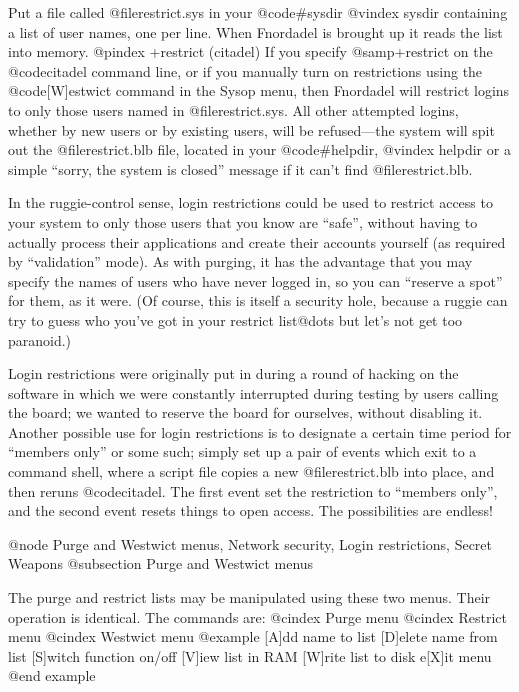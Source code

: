 Put a file called @file{restrict.sys} in your @code{#sysdir}
@vindex sysdir
containing a list of user names, one per line.  When
Fnordadel is brought up it reads the list into memory.
@pindex +restrict (citadel)
If you specify @samp{+restrict} on the @code{citadel} command
line, or if you manually turn on restrictions using the
@code{[W]estwict} command in the Sysop menu, then Fnordadel will
restrict logins to only those users named in @file{restrict.sys}.
All other attempted logins, whether by new users or by
existing users, will be refused---the system will spit
out the @file{restrict.blb} file, located in your @code{#helpdir},
@vindex helpdir
or a simple ``sorry, the system is closed'' message if it
can't find @file{restrict.blb}.

In the ruggie-control sense, login restrictions
could be used to restrict access to your system to only
those users that you know are ``safe'', without having to
actually process their applications and create their
accounts yourself (as required by ``validation'' mode).  As with purging,
it has the advantage that you may specify the names of
users who have never logged in, so you can ``reserve a
spot'' for them, as it were.  (Of course, this is itself a security
hole, because a ruggie can try to guess who you've got
in your restrict list@dots{} but let's not get too paranoid.)

Login restrictions were originally put in during
a round of hacking on the software in which we were
constantly interrupted during testing by users calling
the board; we wanted to reserve the board for ourselves,
without disabling it.  Another possible use for login
restrictions is to designate a certain time period for
``members only'' or some such; simply set up a pair of
events which exit to a command shell, where a script file
copies a new @file{restrict.blb} into place, and then reruns
@code{citadel}.  The first event set the restriction to
``members only'', and the second event resets things to open
access.  The possibilities are endless!

@node Purge and Westwict menus, Network security, Login restrictions, Secret Weapons
@subsection Purge and Westwict menus

The purge and restrict lists may be manipulated using
these two menus.  Their operation is identical.  The commands are:
@cindex Purge menu
@cindex Restrict menu
@cindex Westwict menu
@example
[A]dd name to list
[D]elete name from list
[S]witch function on/off
[V]iew list in RAM
[W]rite list to disk
e[X]it menu
@end example


